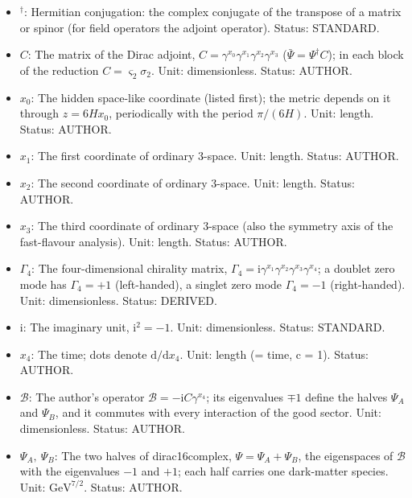 \documentclass[
  10pt,
]{article}
\begin{document}
\begin{itemize}
  fold bands; \(\bar\Psi = \Psi^\dagger C\) is its Dirac adjoint. Unit:
  \(\mathrm{GeV}^{7/2}\). Status: RECORD.
\item
  \({}^\dagger\): Hermitian conjugation: the complex conjugate of the
  transpose of a matrix or spinor (for field operators the adjoint
  operator). Status: STANDARD.
\item
  \(C\): The matrix of the Dirac adjoint,
  \(C = \gamma^{x_0}\gamma^{x_1}\gamma^{x_2}\gamma^{x_3}\)
  (\(\bar\Psi = \Psi^\dagger C\)); in each block of the reduction
  \(C = \varsigma_2\sigma_2\). Unit: dimensionless. Status: AUTHOR.
\item
  \(x_0\): The hidden space-like coordinate (listed first); the metric
  depends on it through \(z = 6Hx_0\), periodically with the period
  \(\pi/(6H)\). Unit: length. Status: AUTHOR.
\item
  \(x_1\): The first coordinate of ordinary 3-space. Unit: length.
  Status: AUTHOR.
\item
  \(x_2\): The second coordinate of ordinary 3-space. Unit: length.
  Status: AUTHOR.
\item
  \(x_3\): The third coordinate of ordinary 3-space (also the symmetry
  axis of the fast-flavour analysis). Unit: length. Status: AUTHOR.
\item
  \(\Gamma_4\): The four-dimensional chirality matrix,
  \(\Gamma_4 = \mathrm{i}\gamma^{x_1}\gamma^{x_2}\gamma^{x_3}\gamma^{x_4}\);
  a doublet zero mode has \(\Gamma_4 = +1\) (left-handed), a singlet
  zero mode \(\Gamma_4 = -1\) (right-handed). Unit: dimensionless.
  Status: DERIVED.
\item
  \(\mathrm{i}\): The imaginary unit, \(\mathrm{i}^2 = -1\). Unit:
  dimensionless. Status: STANDARD.
\item
  \(x_4\): The time; dots denote \(\mathrm{d}/\mathrm{d}x_4\). Unit:
  length (= time, c = 1). Status: AUTHOR.
\item
  \(\mathcal{B}\): The author's operator
  \(\mathcal{B} = -\mathrm{i}C\gamma^{x_4}\); its eigenvalues \(\mp1\)
  define the halves \(\Psi_A\) and \(\Psi_B\), and it commutes with
  every interaction of the good sector. Unit: dimensionless. Status:
  AUTHOR.
\item
  \(\Psi_A,\ \Psi_B\): The two halves of dirac16complex,
  \(\Psi = \Psi_A + \Psi_B\), the eigenspaces of \(\mathcal{B}\) with
  the eigenvalues \(-1\) and \(+1\); each half carries one dark-matter
  species. Unit: \(\mathrm{GeV}^{7/2}\). Status: AUTHOR.
\end{itemize}
\end{document}

